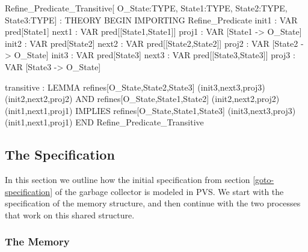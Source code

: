 \begin{smallsession}
Refine_Predicate_Transitive[
  O_State:TYPE, State1:TYPE, State2:TYPE, State3:TYPE] : THEORY
BEGIN
  IMPORTING Refine_Predicate
  init1 : VAR pred[State1]
  next1 : VAR pred[[State1,State1]]
  proj1 : VAR [State1 -> O_State]
  init2 : VAR pred[State2]
  next2 : VAR pred[[State2,State2]]
  proj2 : VAR [State2 -> O_State]
  init3 : VAR pred[State3]
  next3 : VAR pred[[State3,State3]]
  proj3 : VAR [State3 -> O_State]
 
  transitive : LEMMA 
    refines[O_State,State2,State3]
      (init3,next3,proj3)(init2,next2,proj2) AND 
    refines[O_State,State1,State2]
      (init2,next2,proj2)(init1,next1,proj1)
      IMPLIES
    refines[O_State,State1,State3]
      (init3,next3,proj3)(init1,next1,proj1)
END Refine_Predicate_Transitive
\end{smallsession}
\label{refinement-transitive}


\subsection{The Specification}

In this section we outline how the  initial specification from section
\ref{goto-specification} of the garbage collector is modeled in PVS.
We start with the specification of the memory structure, and then continue with
the two processes that work on this shared structure.


\subsubsection{The Memory}

